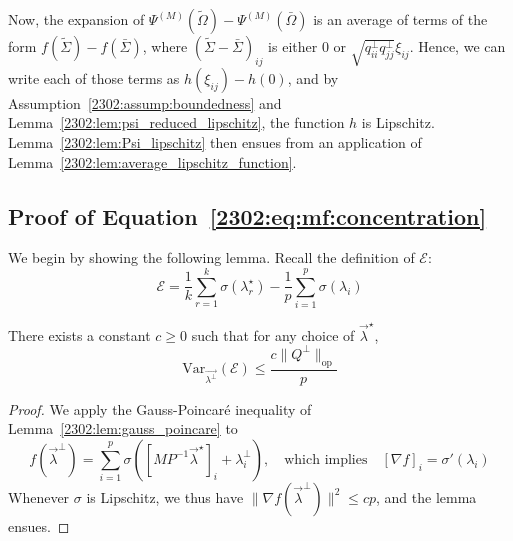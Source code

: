 Now, the expansion of $\Psi^{(M)}(\tilde\Omega) - \Psi^{(M)}(\bar\Omega)$ is an average of terms of the form $f(\tilde\Sigma) - f(\bar\Sigma)$, where $(\tilde\Sigma - \bar\Sigma)_{ij}$ is either $0$ or $\sqrt{q_{ii}^\bot q_{jj}^\bot} \xi_{ij}$. Hence, we can write each of those terms as $h(\xi_{ij}) - h(0)$, and by Assumption~\ref{2302:assump:boundedness} and Lemma~\ref{2302:lem:psi_reduced_lipschitz}, the function $h$ is Lipschitz. Lemma~\ref{2302:lem:Psi_lipschitz} then ensues from an application of Lemma~\ref{2302:lem:average_lipschitz_function}.

\subsection{Proof of Equation~\texorpdfstring{\eqref{2302:eq:mf:concentration}}{\ref{2302:eq:mf:concentration}}}
We begin by showing the following lemma. Recall the definition of $\mathcal{E}$:
\begin{equation}\label{2302:eq:app:def_error}
    \mathcal E = \frac1k\sum_{r=1}^k \sigma(\lambda_r^\star) - \frac1p \sum_{i=1}^p \sigma(\lambda_i)
\end{equation}

\begin{lemma}\label{2302:lem:app:gauss_poincare}
    There exists a constant $c \geq 0$ such that for any choice of $\vec{\lambda}^\star$,
    \[ \mathrm{Var}_{\vec{\lambda^\bot}}\left( \mathcal E \right) \leq \frac{c  \lVert Q^\bot \rVert_{\mathrm{op}}}{p} \]
\end{lemma}

\begin{proof}
    We apply the Gauss-Poincaré inequality of Lemma~\ref{2302:lem:gauss_poincare} to
    \[ f(\vec{\lambda}^\bot) = \sum_{i=1}^p \sigma([M P^{-1}\vec{\lambda}^\star]_i + \lambda_i^\bot), \quad \text{which implies} \quad [\nabla f]_i = \sigma'(\lambda_i)\]
    Whenever $\sigma$ is Lipschitz, we thus have $\lVert\nabla f(\vec{\lambda}^\bot) \rVert^2 \leq c p$, and the lemma ensues.
\end{proof}

